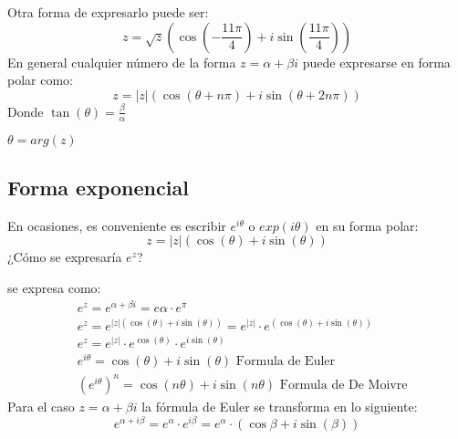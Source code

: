 Otra forma de expresarlo puede ser:
\begin{equation*}
    z = \sqrt{z}\left(\cos{\left( - \frac{11\pi}{4}\right)} + i \sin{\left(\frac{11\pi}{4}\right)} \right)
\end{equation*}
En general cualquier número de la forma $z= \alpha+\beta i$ puede expresarse en forma polar
como:
\begin{equation}
    z =\left\lvert z\right\rvert \left(\cos{\left(\theta + n\pi\right)} + i \sin{\left(\theta + 2n\pi\right)} \right)
\end{equation}
Donde $\tan{(\theta)}= \frac{\beta}{\alpha}$
\begin{notation}
    $\theta=arg(z)$
\end{notation}

\subsection{Forma exponencial}

En ocasiones, es conveniente es escribir $e^{i\theta}$ o $exp(i\theta)$ en su forma polar:
\begin{equation*}
    z =\left\lvert z\right\rvert \left(\cos{(\theta)} + i \sin{(\theta)} \right)
\end{equation*}
¿Cómo se expresaría $e^z$?

se expresa como:
\begin{align*}
    &e^z = e^{\alpha + \beta i} = e{\alpha}\cdot e^{\pi}\\
    &e^z = e^{\left\lvert z\right\rvert\left(\cos{(\theta)} + i \sin{(\theta)} \right)} = e^{\left\lvert z\right\rvert}\cdot e^{\left(\cos{(\theta)} + i \sin{(\theta)} \right)}\\
    &e^z = e^{\left\lvert z\right\rvert}\cdot e^{\cos{(\theta)}}\cdot e^{i \sin{(\theta)}}\\
    &e^{i\theta} = \cos{(\theta)} + i \sin{(\theta)}\text{ Formula de Euler}\\
    &\left(e^{i\theta}\right)^n = \cos{(n\theta)} + i \sin{(n\theta)} \text{ Formula de De Moivre}
\end{align*}   
Para el caso $z=\alpha+\beta i$ la fórmula de Euler se transforma en lo siguiente:
\begin{equation}
    e^{\alpha + i\beta} = e^{\alpha}\cdot e^{i\beta} = e^{\alpha}\cdot \left(\cos{\beta} + i\sin{(\beta)} \right)
\end{equation}

